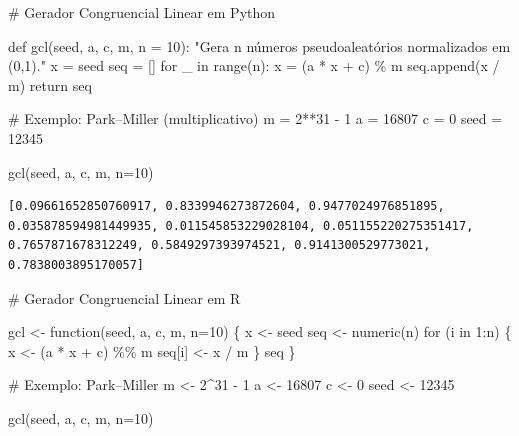 \documentclass[
  letterpaper,
  DIV=11,
  numbers=noendperiod]{scrreprt}
\newenvironment{Shaded}{\begin{snugshade}}{\end{snugshade}}
\newcommand{\AttributeTok}[1]{\textcolor[rgb]{0.40,0.45,0.13}{#1}}
\newcommand{\BuiltInTok}[1]{\textcolor[rgb]{0.00,0.23,0.31}{#1}}
\newcommand{\CommentTok}[1]{\textcolor[rgb]{0.37,0.37,0.37}{#1}}
\newcommand{\ControlFlowTok}[1]{\textcolor[rgb]{0.00,0.23,0.31}{#1}}
\newcommand{\DecValTok}[1]{\textcolor[rgb]{0.68,0.00,0.00}{#1}}
\newcommand{\FunctionTok}[1]{\textcolor[rgb]{0.28,0.35,0.67}{#1}}
\newcommand{\KeywordTok}[1]{\textcolor[rgb]{0.00,0.23,0.31}{#1}}
\newcommand{\NormalTok}[1]{\textcolor[rgb]{0.00,0.23,0.31}{#1}}
\newcommand{\OperatorTok}[1]{\textcolor[rgb]{0.37,0.37,0.37}{#1}}
\newcommand{\OtherTok}[1]{\textcolor[rgb]{0.00,0.23,0.31}{#1}}
\newcommand{\SpecialCharTok}[1]{\textcolor[rgb]{0.37,0.37,0.37}{#1}}
\begin{document}
\begin{Shaded}
\begin{Highlighting}[]
\CommentTok{\# Gerador Congruencial Linear em Python}

\KeywordTok{def}\NormalTok{ gcl(seed, a, c, m, n }\OperatorTok{=} \DecValTok{10}\NormalTok{):}
    \CommentTok{"Gera n números pseudoaleatórios normalizados em (0,1)."}
\NormalTok{    x }\OperatorTok{=}\NormalTok{ seed}
\NormalTok{    seq }\OperatorTok{=}\NormalTok{ []}
    \ControlFlowTok{for}\NormalTok{ \_ }\KeywordTok{in} \BuiltInTok{range}\NormalTok{(n):}
\NormalTok{        x }\OperatorTok{=}\NormalTok{ (a }\OperatorTok{*}\NormalTok{ x }\OperatorTok{+}\NormalTok{ c) }\OperatorTok{\%}\NormalTok{ m}
\NormalTok{        seq.append(x }\OperatorTok{/}\NormalTok{ m)}
    \ControlFlowTok{return}\NormalTok{ seq}

\CommentTok{\# Exemplo: Park–Miller (multiplicativo)}
\NormalTok{m }\OperatorTok{=} \DecValTok{2}\OperatorTok{**}\DecValTok{31} \OperatorTok{{-}} \DecValTok{1}
\NormalTok{a }\OperatorTok{=} \DecValTok{16807}
\NormalTok{c }\OperatorTok{=} \DecValTok{0}
\NormalTok{seed }\OperatorTok{=} \DecValTok{12345}

\NormalTok{gcl(seed, a, c, m, n}\OperatorTok{=}\DecValTok{10}\NormalTok{)}
\end{Highlighting}
\end{Shaded}

\begin{verbatim}
[0.09661652850760917, 0.8339946273872604, 0.9477024976851895, 0.035878594981449935, 0.011545853229028104, 0.051155220275351417, 0.7657871678312249, 0.5849297393974521, 0.9141300529773021, 0.7838003895170057]
\end{verbatim}

\begin{Shaded}
\begin{Highlighting}[]
\CommentTok{\# Gerador Congruencial Linear em R}

\NormalTok{gcl }\OtherTok{\textless{}{-}} \ControlFlowTok{function}\NormalTok{(seed, a, c, m, }\AttributeTok{n=}\DecValTok{10}\NormalTok{) \{}
\NormalTok{  x }\OtherTok{\textless{}{-}}\NormalTok{ seed}
\NormalTok{  seq }\OtherTok{\textless{}{-}} \FunctionTok{numeric}\NormalTok{(n)}
  \ControlFlowTok{for}\NormalTok{ (i }\ControlFlowTok{in} \DecValTok{1}\SpecialCharTok{:}\NormalTok{n) \{}
\NormalTok{    x }\OtherTok{\textless{}{-}}\NormalTok{ (a }\SpecialCharTok{*}\NormalTok{ x }\SpecialCharTok{+}\NormalTok{ c) }\SpecialCharTok{\%\%}\NormalTok{ m}
\NormalTok{    seq[i] }\OtherTok{\textless{}{-}}\NormalTok{ x }\SpecialCharTok{/}\NormalTok{ m}
\NormalTok{  \}}
\NormalTok{  seq}
\NormalTok{\}}

\CommentTok{\# Exemplo: Park–Miller}
\NormalTok{m }\OtherTok{\textless{}{-}} \DecValTok{2}\SpecialCharTok{\^{}}\DecValTok{31} \SpecialCharTok{{-}} \DecValTok{1}
\NormalTok{a }\OtherTok{\textless{}{-}} \DecValTok{16807}
\NormalTok{c }\OtherTok{\textless{}{-}} \DecValTok{0}
\NormalTok{seed }\OtherTok{\textless{}{-}} \DecValTok{12345}

\FunctionTok{gcl}\NormalTok{(seed, a, c, m, }\AttributeTok{n=}\DecValTok{10}\NormalTok{)}
\end{Highlighting}
\end{Shaded}
\end{document}

